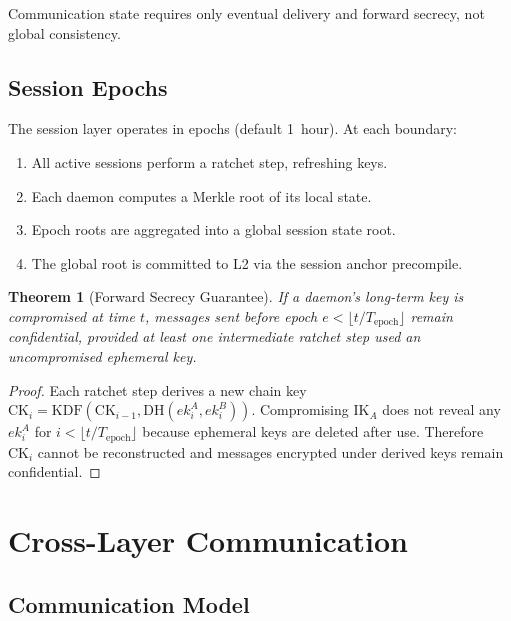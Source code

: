 \documentclass[11pt,a4paper]{article}
\newtheorem{theorem}{Theorem}[section]
\begin{document}
Communication state requires only eventual delivery and forward secrecy,
not global consistency.

\subsection{Session Epochs}

The session layer operates in epochs (default 1~hour).  At each boundary:

\begin{enumerate}
    \item All active sessions perform a ratchet step, refreshing keys.
    \item Each daemon computes a Merkle root of its local state.
    \item Epoch roots are aggregated into a global session state root.
    \item The global root is committed to L2 via the session anchor
    precompile.
\end{enumerate}

\begin{theorem}[Forward Secrecy Guarantee]
    \label{thm:forward-secrecy}
    If a daemon's long-term key is compromised at time $t$, messages sent
    before epoch $e < \lfloor t / T_{\mathrm{epoch}} \rfloor$ remain
    confidential, provided at least one intermediate ratchet step used an
    uncompromised ephemeral key.
\end{theorem}

\begin{proof}
    Each ratchet step derives a new chain key
    $\mathrm{CK}_i = \mathrm{KDF}(\mathrm{CK}_{i-1},
    \mathrm{DH}(ek_i^A, ek_i^B))$.
    Compromising $\mathrm{IK}_A$ does not reveal any $ek_i^A$ for
    $i < \lfloor t / T_{\mathrm{epoch}} \rfloor$ because ephemeral keys
    are deleted after use.  Therefore $\mathrm{CK}_i$ cannot be
    reconstructed and messages encrypted under derived keys remain
    confidential.
\end{proof}

\section{Cross-Layer Communication}
\label{sec:crosslayer}

\subsection{Communication Model}
\end{document}
